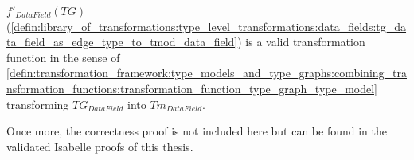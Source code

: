 \begin{thm}
\label{defin:library_of_transformations:type_level_transformations:data_fields:tg_data_field_as_edge_type_to_tmod_data_field_func}
$f'_{DataField}(TG)$ (\cref{defin:library_of_transformations:type_level_transformations:data_fields:tg_data_field_as_edge_type_to_tmod_data_field}) is a valid transformation function in the sense of \cref{defin:transformation_framework:type_models_and_type_graphs:combining_transformation_functions:transformation_function_type_graph_type_model} transforming $TG_{DataField}$ into $Tm_{DataField}$.
\end{thm}

Once more, the correctness proof is not included here but can be found in the validated Isabelle proofs of this thesis.